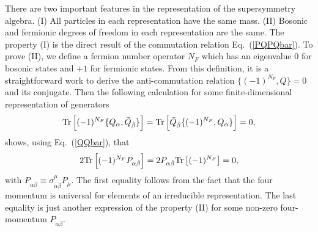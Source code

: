 \documentclass[12pt,twoside,book]{article}
\begin{document}
There are two important features in the representation of the supersymmetry algebra.
(I) All particles in each representation have the same mass.
(II) Bosonic and fermionic degrees of freedom in each representation are the same.
The property (I) is the direct result of the commutation relation Eq.\ (\ref{PQPQbar}).
To prove (II), we define a fermion number operator $N_F$ which has an eigenvalue $0$ for bosonic states and $+1$ for fermionic states.
From this definition, it is a straightforward work to derive the anti-commutation relation $\{(-1)^{N_F},Q\}=0$ and its conjugate.
Then the following calculation for some finite-dimensional representation of generators
\begin{align}
  {\rm Tr} \left[ (-1)^{N_F} \{Q_\alpha, \bar{Q}_{\dot{\beta}}\} \right]
  = {\rm Tr} \left[ \bar{Q}_{\dot{\beta}} \{ (-1)^{N_F}, Q_\alpha \} \right] = 0,
\end{align}
shows, using Eq.\ (\ref{QQbar}), that
\begin{align}
  2{\rm Tr} \left[ (-1)^{N_F} P_{\alpha \dot{\beta}} \right]
  = 2P_{\alpha \dot{\beta}} {\rm Tr} \left[(-1)^{N_F} \right] = 0,
\end{align}
with $P_{\alpha \dot{\beta}} \equiv \sigma^\mu_{\alpha \dot{\beta}} P_\mu$.
The first equality follows from the fact that the four momentum is universal for elements of an irreducible representation.
The last equality is just another expression of the property (II) for some non-zero four-momentum $P_{\alpha \dot{\beta}}$.
\end{document}
